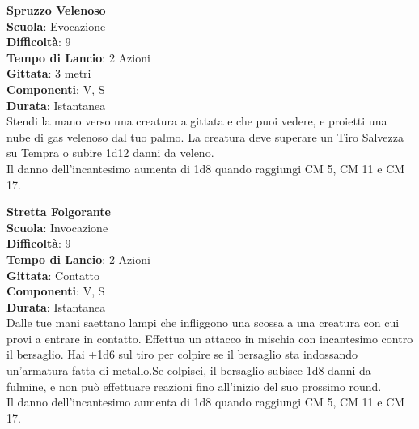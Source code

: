 \begin{multicols}{2}
\medskip\textbf{Spruzzo Velenoso}\\
\textbf{Scuola}: Evocazione\\
\textbf{Difficoltà}: 9\\
\textbf{Tempo di Lancio}: 2 Azioni\\
\textbf{Gittata}: 3 metri\\
\textbf{Componenti}: V, S\\
\textbf{Durata}: Istantanea\\
Stendi la mano verso una creatura a gittata e che puoi vedere, e proietti una nube di gas velenoso dal tuo palmo. La creatura deve superare un Tiro Salvezza su Tempra o subire 1d12 danni da veleno. \\
Il danno dell'incantesimo aumenta di 1d8 quando raggiungi CM 5, CM 11 e CM 17.

\medskip\textbf{Stretta Folgorante}\\
\textbf{Scuola}: Invocazione\\
\textbf{Difficoltà}: 9\\
\textbf{Tempo di Lancio}: 2 Azioni\\
\textbf{Gittata}: Contatto\\
\textbf{Componenti}: V, S\\
\textbf{Durata}: Istantanea\\
Dalle tue mani saettano lampi che infliggono una scossa a una creatura con cui provi a entrare in contatto. Effettua un attacco in mischia con incantesimo contro il bersaglio. Hai +1d6 sul tiro per colpire se il bersaglio sta indossando un'armatura fatta di metallo.Se colpisci, il bersaglio subisce 1d8 danni da fulmine, e non può effettuare reazioni fino all'inizio del suo prossimo round.\\
Il danno dell'incantesimo aumenta di 1d8 quando raggiungi CM 5, CM 11 e CM 17.


\end{multicols}
